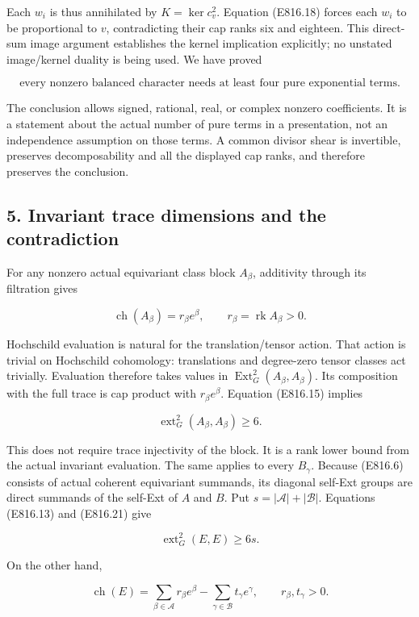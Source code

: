 Each \(w_i\) is thus annihilated by \(K=\ker c_v^2\). Equation (E816.18)
forces each \(w_i\) to be proportional to \(v\), contradicting their cap
ranks six and eighteen. This direct-sum image argument establishes the
kernel implication explicitly; no unstated image/kernel duality is being
used. We have proved

\[
 \boxed{\text{every nonzero balanced character needs at least four pure exponential terms.}}
 \tag{E816.20}
\]

The conclusion allows signed, rational, real, or complex nonzero
coefficients. It is a statement about the actual number of pure terms in
a presentation, not an independence assumption on those terms. A common
divisor shear is invertible, preserves decomposability and all the
displayed cap ranks, and therefore preserves the conclusion.

\subsection{5. Invariant trace dimensions and the
contradiction}\label{SF-E816-invariant-trace-dimensions-and-the-contradiction}

For any nonzero actual equivariant class block \(A_\beta\), additivity
through its filtration gives

\[
 \operatorname{ch}(A_\beta)=r_\beta e^\beta,
 \qquad r_\beta=\operatorname{rk}A_\beta>0.
\]

Hochschild evaluation is natural for the translation/tensor action. That
action is trivial on Hochschild cohomology: translations and degree-zero
tensor classes act trivially. Evaluation therefore takes values in
\(\operatorname{Ext}^2_G(A_\beta,A_\beta)\). Its composition with the
full trace is cap product with \(r_\beta e^\beta\). Equation (E816.15)
implies

\[
 \operatorname{ext}^2_G(A_\beta,A_\beta)\ge6.
 \tag{E816.21}
\]

This does not require trace injectivity of the block. It is a rank lower
bound from the actual invariant evaluation. The same applies to every
\(B_\gamma\). Because (E816.6) consists of actual coherent equivariant
summands, its diagonal self-Ext groups are direct summands of the
self-Ext of \(A\) and \(B\). Put \(s=|\mathcal A|+|\mathcal B|\).
Equations (E816.13) and (E816.21) give

\[
 \operatorname{ext}^2_G(E,E)\ge6s.
 \tag{E816.22}
\]

On the other hand,

\[
 \operatorname{ch}(E)
   =\sum_{\beta\in\mathcal A}r_\beta e^\beta
       -\sum_{\gamma\in\mathcal B}t_\gamma e^\gamma,
 \qquad r_\beta,t_\gamma>0.
 \tag{E816.23}
\]


